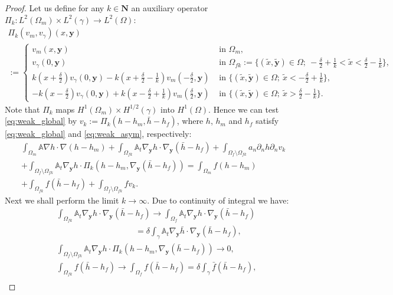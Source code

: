\documentclass[a4paper]{article}
\def\vc#1{\mathbf{\boldsymbol{#1}}}     %
\def\tn#1{{\mathbb{#1}}}    %
\def\Natural{\mathbf N}
\def\yy{{\vc y}}
\begin{document}
\begin{proof}
Let us define for any $k\in\Natural$ an auxiliary operator $\Pi_k:L^2(\Omega_m)\times L^2(\gamma)\to L^2(\Omega)$:
\begin{multline*}
\Pi_k(v_m,v_\gamma)(x,\vc y)\\ :=
\begin{cases}
v_m(x,\vc y) & \mbox{ in }\Omega_m,\\
v_\gamma(0,\vc y) & \mbox{ in }\Omega_{fk}:=\{(\tilde x,\tilde{\vc y})\in\Omega;~-\frac\delta2+\frac1k<\tilde x<\frac\delta2-\frac1k\},\\
k(x+\frac\delta2)v_\gamma(0,\vc y) - k(x+\frac\delta2-\frac1k)v_m(-\frac\delta2,\vc y) & \mbox{ in }\{(\tilde x,\tilde{\vc y})\in\Omega;~\tilde x<-\frac\delta2+\frac1k\},\\
-k(x-\frac\delta2)v_\gamma(0,\vc y) + k(x-\frac\delta2+\frac1k)v_m(\frac\delta2,\vc y) & \mbox{ in }\{(\tilde x,\tilde{\vc y})\in\Omega;~\tilde x>\frac\delta2-\frac1k\}.
\end{cases}
\end{multline*}
Note that $\Pi_k$ maps $H^1(\Omega_m)\times H^{1/2}(\gamma)$ into $H^1(\Omega)$.
Hence we can test \eqref{eq:weak_global} by $v_k:=\Pi_k(h-h_m,\bar h-h_f)$, where $h$, $h_m$ and $h_f$ satisfy \eqref{eq:weak_global} and \eqref{eq:weak_asym}, respectively:
\begin{multline}
\label{eq:global_vk}
\int_{\Omega_m}\tn A\nabla h\cdot\nabla(h-h_m)
+\int_{\Omega_{fk}}\tn A_t\nabla_\yy h\cdot\nabla_\yy(\bar h-h_f)
+\int_{\Omega_f\setminus\Omega_{fk}} a_n\partial_n h \partial_n v_k\\
+ \int_{\Omega_f\setminus\Omega_{fk}} \tn A_t\nabla_\yy h \cdot \Pi_k(h-h_m,\nabla_\yy(\bar h-h_f))
= \int_{\Omega_m} f (h-h_m)\\
+ \int_{\Omega_{fk}} f (\bar h-h_f)
+ \int_{\Omega_f\setminus\Omega_{fk}} f v_k.
\end{multline}
Next we shall perform the limit $k\to\infty$.
Due to continuity of integral we have:
\begin{align}
&\int_{\Omega_{fk}}\tn A_t\nabla_\yy h\cdot\nabla_\yy(\bar h-h_f) \to \int_{\Omega_f}\tn A_t\nabla_\yy h\cdot\nabla_\yy(\bar h-h_f)\\
&\hspace{4cm} = \delta\int_\gamma\tn A_t\nabla_\yy\bar h\cdot\nabla_\yy(\bar h-h_f),\\
&\int_{\Omega_f\setminus\Omega_{fk}} \tn A_t\nabla_\yy h \cdot \Pi_k(h-h_m,\nabla_\yy(\bar h-h_f)) \to 0, \\
&\int_{\Omega_{fk}} f (\bar h-h_f) \to \int_{\Omega_{f}} f (\bar h-h_f) = \delta\int_{\gamma} \bar f (\bar h-h_f), \\

\end{align}
\end{proof}
\end{document}
